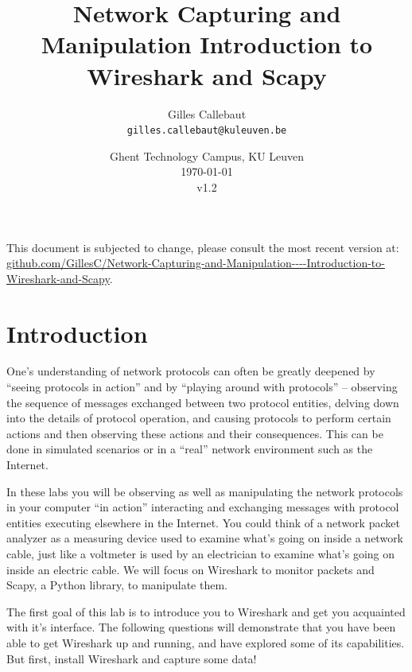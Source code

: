 \documentclass[11pt,a4paper]{article}
\title{Network Capturing and Manipulation Introduction to Wireshark and Scapy}
\author{Gilles Callebaut\\ \texttt{gilles.callebaut@kuleuven.be}}
\date{Ghent Technology Campus, KU Leuven\\ \today \\v1.2}
\begin{document}
 \sloppy

\maketitle

\begin{versionhistory}
\end{versionhistory}

\vfill
{\footnotesize
This document is subjected to change, please consult the most recent version at: \url{github.com/GillesC/Network-Capturing-and-Manipulation----Introduction-to-Wireshark-and-Scapy}.
}


\clearpage

\setcounter{tocdepth}{2}
\tableofcontents
\clearpage

\section{Introduction}
One's understanding of network protocols can often be greatly deepened by ``seeing
protocols in action'' and by ``playing around with protocols'' – observing the sequence of messages exchanged between two protocol entities, delving down into the details of protocol operation, and causing protocols to perform certain actions and then observing these actions and their consequences. This can be done in simulated scenarios or in a ``real'' network environment such as the Internet. 

In these labs you will be observing as well as manipulating the network protocols in your computer ``in action'' interacting and exchanging messages with protocol entities executing elsewhere in the Internet. 
You could think of a network packet analyzer as a measuring device used to examine what's going on inside a network cable, just like a voltmeter is used by an electrician to examine what's going on inside an electric cable. We will focus on Wireshark to monitor packets and Scapy, a Python library, to manipulate them. 

The first goal of this lab is to introduce you to Wireshark and get you acquainted with it's interface. The following questions will demonstrate that you have been able to get Wireshark up and running, and have explored some of its capabilities.
But first, install Wireshark and capture some data!
\end{document}
